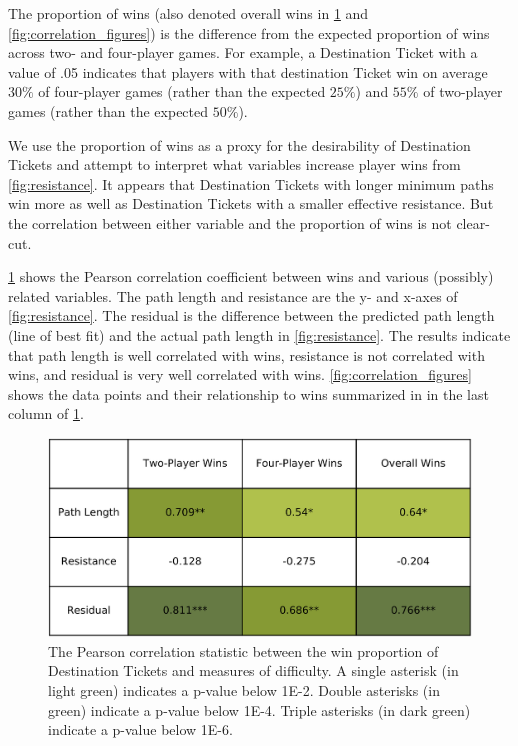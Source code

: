 The proportion of wins (also denoted overall wins
in \cref{fig:correlation_table} and \cref{fig:correlation_figures})
is the difference from the expected proportion of wins
across two- and four-player games.
For example, a Destination Ticket with a value of .05 indicates
that players with that destination Ticket 
win on average $30\%$ of four-player games
(rather than the expected $25\%$) and $55\%$ of 
two-player games (rather than the expected $50\%$).

We use the proportion of wins as a proxy for the desirability
of Destination Tickets and attempt to interpret what variables
increase player wins from \cref{fig:resistance}.
It appears that Destination Tickets with longer minimum paths win
more as well as Destination Tickets with 
a smaller effective resistance.
But the correlation between either variable and the proportion
of wins is not clear-cut.

\cref{fig:correlation_table} shows the Pearson 
correlation coefficient
between wins and various (possibly) related variables.
The path length and resistance are the y- and x-axes of 
\cref{fig:resistance}.
The residual is the difference between the predicted
path length (line of best fit) and the actual path length
in \cref{fig:resistance}.
The results indicate that path length is well correlated with wins,
resistance is not correlated with wins, and residual is very
well correlated with wins.
\cref{fig:correlation_figures} shows the data points and
their relationship to wins summarized in
in the last column of \cref{fig:correlation_table}.

\begin{figure}[h]
    \centering
    \includegraphics[scale=.12]{figures/pearsons_table.png}
    \caption{The Pearson correlation statistic between
    the win proportion of Destination Tickets
    and measures of difficulty.
    A single asterisk (in light green) indicates a p-value
    below 1E-2. Double asterisks (in green) indicate a
    p-value below 1E-4. Triple asterisks (in dark green)
    indicate a p-value below 1E-6.}
    \label{fig:correlation_table}
\end{figure}

